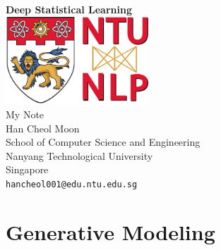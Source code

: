 \documentclass[oneside, a4paper,11pt]{book}
\begin{document}
\begin{titlepage}
	\begin{center}
		\vspace*{5.5cm}
		\textbf{\Huge Deep Statistical Learning}\\
        \vspace{2.5cm}
		\includegraphics[width=0.4\textwidth]{./logo/ntunlp_logo.png}\\
        \vspace{1.5cm}
        \Large My Note \\
        \vspace{1.5cm}
		Han Cheol Moon\\
		School of Computer Science and Engineering\\
		Nanyang Technological University\\
		Singapore\\
		\texttt{hancheol001@edu.ntu.edu.sg}
            
		\date{\today}
	\end{center}
\end{titlepage}

\tableofcontents
\newpage


\mainmatter






% 
\part{Generative Modeling}




\backmatter

\nocite{*}


\end{document}
